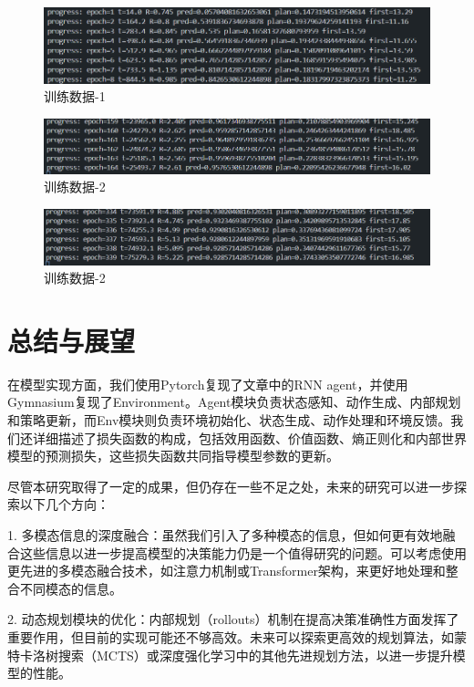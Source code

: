 \documentclass[UTF8,12pt]{article} %
\begin{document}
\begin{figure}[H]
	\center
	\includegraphics*[width=16cm]{figs/image-00.png}
	\centering
	\caption{训练数据-1}\label{fig:train-data-1}
\end{figure}

\begin{figure}[H]
	\center
	\includegraphics*[width=16cm]{figs/image-02.png}
	\centering
	\caption{训练数据-2}\label{fig:train-data-2}
\end{figure}

\begin{figure}[H]
	\center
	\includegraphics*[width=16cm]{figs/image-04.png}
	\centering
	\caption{训练数据-2}\label{fig:train-data-3}
\end{figure}


\section{总结与展望}
在模型实现方面，我们使用Pytorch复现了文章中的RNN agent，并使用Gymnasium复现了Environment。Agent模块负责状态感知、动作生成、内部规划和策略更新，而Env模块则负责环境初始化、状态生成、动作处理和环境反馈。我们还详细描述了损失函数的构成，包括效用函数、价值函数、熵正则化和内部世界模型的预测损失，这些损失函数共同指导模型参数的更新。

尽管本研究取得了一定的成果，但仍存在一些不足之处，未来的研究可以进一步探索以下几个方向：

1. 多模态信息的深度融合：虽然我们引入了多种模态的信息，但如何更有效地融合这些信息以进一步提高模型的决策能力仍是一个值得研究的问题。可以考虑使用更先进的多模态融合技术，如注意力机制或Transformer架构，来更好地处理和整合不同模态的信息。

2. 动态规划模块的优化：内部规划（rollouts）机制在提高决策准确性方面发挥了重要作用，但目前的实现可能还不够高效。未来可以探索更高效的规划算法，如蒙特卡洛树搜索（MCTS）或深度强化学习中的其他先进规划方法，以进一步提升模型的性能。
\end{document}
